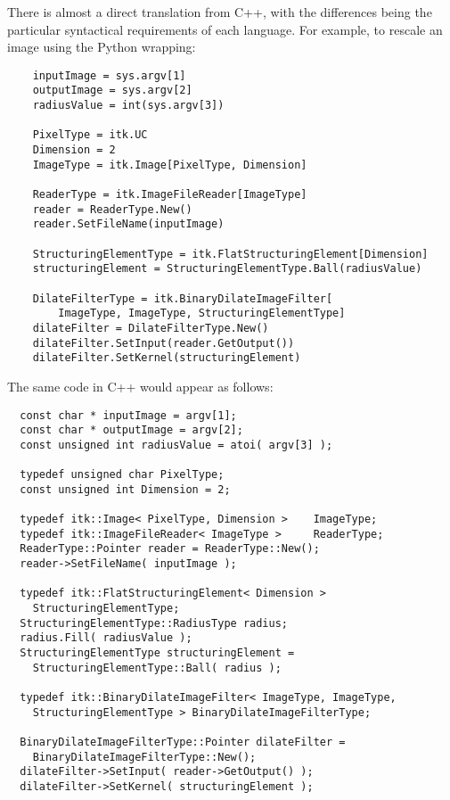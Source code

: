 There is almost a direct translation from C++, with the differences being the
particular syntactical requirements of each language. For example, to rescale
an image using the Python wrapping:
\small
\begin{verbatim}
    inputImage = sys.argv[1]
    outputImage = sys.argv[2]
    radiusValue = int(sys.argv[3])

    PixelType = itk.UC
    Dimension = 2
    ImageType = itk.Image[PixelType, Dimension]

    ReaderType = itk.ImageFileReader[ImageType]
    reader = ReaderType.New()
    reader.SetFileName(inputImage)

    StructuringElementType = itk.FlatStructuringElement[Dimension]
    structuringElement = StructuringElementType.Ball(radiusValue)

    DilateFilterType = itk.BinaryDilateImageFilter[
        ImageType, ImageType, StructuringElementType]
    dilateFilter = DilateFilterType.New()
    dilateFilter.SetInput(reader.GetOutput())
    dilateFilter.SetKernel(structuringElement)
\end{verbatim}
\normalsize
The same code in C++ would appear as follows:

\small
\begin{verbatim}
  const char * inputImage = argv[1];
  const char * outputImage = argv[2];
  const unsigned int radiusValue = atoi( argv[3] );

  typedef unsigned char PixelType;
  const unsigned int Dimension = 2;

  typedef itk::Image< PixelType, Dimension >    ImageType;
  typedef itk::ImageFileReader< ImageType >     ReaderType;
  ReaderType::Pointer reader = ReaderType::New();
  reader->SetFileName( inputImage );

  typedef itk::FlatStructuringElement< Dimension >
    StructuringElementType;
  StructuringElementType::RadiusType radius;
  radius.Fill( radiusValue );
  StructuringElementType structuringElement =
    StructuringElementType::Ball( radius );

  typedef itk::BinaryDilateImageFilter< ImageType, ImageType,
    StructuringElementType > BinaryDilateImageFilterType;

  BinaryDilateImageFilterType::Pointer dilateFilter =
    BinaryDilateImageFilterType::New();
  dilateFilter->SetInput( reader->GetOutput() );
  dilateFilter->SetKernel( structuringElement );
\end{verbatim}
\normalsize

